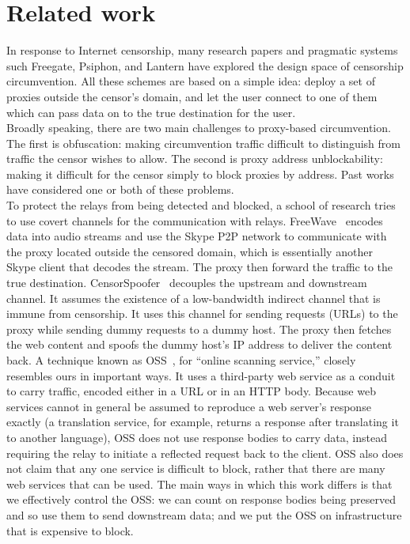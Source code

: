 \documentclass{article}
\begin{document}

\section{Related work}

In response to Internet censorship, many research papers and pragmatic systems
such Freegate, Psiphon, and Lantern have explored the design space of censorship
circumvention. All these schemes are based on a simple idea: deploy a set of
proxies outside the censor's domain, and let the user connect to one of them
which can pass data on to the true destination for the user.\\

Broadly speaking, there are two main challenges to proxy-based circumvention.
The first is obfuscation: making circumvention traffic difficult to distinguish
from traffic the censor wishes to allow. The second is proxy address
unblockability: making it difficult for the censor simply to block proxies by
address. Past works have considered one or both of these problems.\\

To protect the relays from being detected and blocked, a school of research
tries to use covert channels for the communication with relays.
FreeWave~\cite{freewave} encodes data into audio streams and use the Skype P2P
network to communicate with the proxy located outside the censored domain, which
is essentially another Skype client that decodes the stream. The proxy then
forward the traffic to the true destination. CensorSpoofer~\cite{censorspoofer}
decouples the upstream and downstream channel. It assumes the existence of a
low-bandwidth indirect channel that is immune from censorship. It uses this
channel for sending requests (URLs) to the proxy while sending dummy requests to a
dummy host. The proxy then fetches the web content and spoofs the dummy host's
IP address to deliver the content back. A technique known as OSS~\cite{oss}, for
``online scanning service,'' closely resembles ours in important ways. It uses a
third-party web service as a conduit to carry traffic, encoded either in a URL
or in an HTTP body. Because web services cannot in general be assumed to
reproduce a web server's response exactly (a translation service, for example,
returns a response after translating it to another language), OSS does not use
response bodies to carry data, instead requiring the relay to initiate a
reflected request back to the client. OSS also does not claim that any one
service is difficult to block, rather that there are many web services that can
be used. The main ways in which this work differs is that we effectively control
the OSS: we can count on response bodies being preserved and so use them to send
downstream data; and we put the OSS on infrastructure that is expensive to
block.\\
\end{document}

